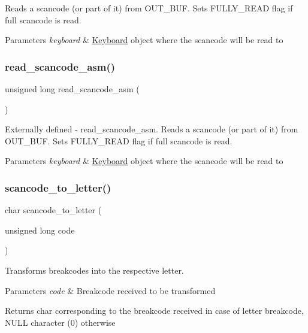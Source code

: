 Reads a scancode (or part of it) from O\+U\+T\+\_\+\+B\+UF. Sets F\+U\+L\+L\+Y\+\_\+\+R\+E\+AD flag if full scancode is read. 


\begin{DoxyParams}{Parameters}
{\em keyboard} & \hyperlink{struct_keyboard}{Keyboard} \textquotesingle{}object\textquotesingle{} where the scancode will be read to \\
\hline
\end{DoxyParams}
\hypertarget{group__keyboard_ga4f6e388e1ad885350358a234aeed5be7}{}\label{group__keyboard_ga4f6e388e1ad885350358a234aeed5be7} 
\subsubsection{\texorpdfstring{read\+\_\+scancode\+\_\+asm()}{read\_scancode\_asm()}}
{\footnotesize\ttfamily unsigned long read\+\_\+scancode\+\_\+asm (\begin{DoxyParamCaption}{ }\end{DoxyParamCaption})}



Externally defined -\/ read\+\_\+scancode\+\_\+asm. Reads a scancode (or part of it) from O\+U\+T\+\_\+\+B\+UF. Sets F\+U\+L\+L\+Y\+\_\+\+R\+E\+AD flag if full scancode is read. 


\begin{DoxyParams}{Parameters}
{\em keyboard} & \hyperlink{struct_keyboard}{Keyboard} \textquotesingle{}object\textquotesingle{} where the scancode will be read to \\
\hline
\end{DoxyParams}
\hypertarget{group__keyboard_ga837f1700d58c441769ddcfdae9792f13}{}\label{group__keyboard_ga837f1700d58c441769ddcfdae9792f13} 
\subsubsection{\texorpdfstring{scancode\+\_\+to\+\_\+letter()}{scancode\_to\_letter()}}
{\footnotesize\ttfamily char scancode\+\_\+to\+\_\+letter (\begin{DoxyParamCaption}\item[{unsigned long}]{code }\end{DoxyParamCaption})}



Transforms breakcodes into the respective letter. 


\begin{DoxyParams}{Parameters}
{\em code} & Breakcode received to be transformed \\
\hline
\end{DoxyParams}
\begin{DoxyReturn}{Returns}
char corresponding to the breakcode received in case of letter breakcode, N\+U\+LL character (0) otherwise 
\end{DoxyReturn}
